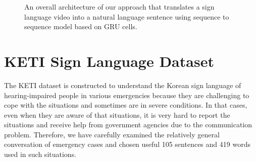 \documentclass[10pt,twocolumn,letterpaper]{article}
\begin{document}
\begin{figure*}
\caption{An overall architecture of our approach that translates a sign language video into a natural language sentence using sequence to sequence model based on GRU cells.}
\end{figure*}


\section{KETI Sign Language Dataset}

The KETI dataset is constructed to understand the Korean sign language of hearing-impaired people in various emergencies because they are challenging to cope with the situations and sometimes are in severe conditions.
In that cases, even when they are aware of that situations, it is very hard to report the situations and receive help from government agencies due to the communication problem.
Therefore, we have carefully examined the relatively general conversation of emergency cases and chosen useful 105 sentences and 419 words used in such situations.
\end{document}
